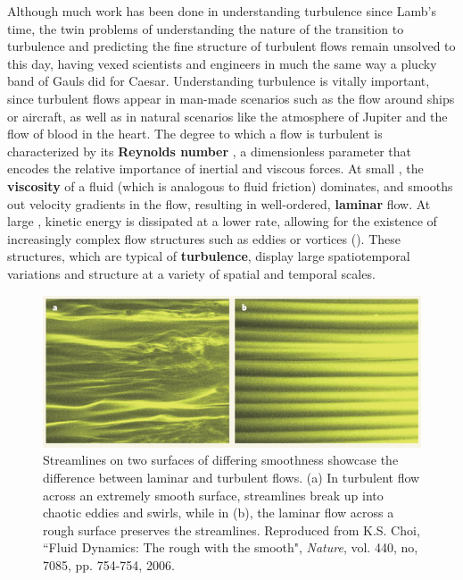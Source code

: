 Although much work has been done in understanding turbulence since Lamb's time, the twin problems of understanding the nature of the transition to turbulence and predicting the fine structure of turbulent flows remain unsolved to this day, having vexed scientists and engineers in much the same way a plucky band of Gauls did for Caesar. Understanding turbulence is vitally important, since turbulent flows appear in man-made scenarios such as the flow around ships or aircraft, as well as in natural scenarios like the atmosphere of Jupiter and the flow of blood in the heart. The degree to which a flow is turbulent is characterized by its {\bf Reynolds number} \ReN, a dimensionless parameter that encodes the relative importance of inertial and viscous forces. At small \ReN, the {\bf viscosity} of a fluid (which is analogous to fluid friction) dominates, and smooths out velocity gradients in the flow, resulting in well-ordered, {\bf laminar} flow. At large \ReN, kinetic energy is dissipated at a lower rate, allowing for the existence of increasingly complex flow structures such as eddies or vortices (). These structures, which are typical of {\bf turbulence}, display large spatiotemporal variations and structure at a variety of spatial and temporal scales.
\begin{figure}[h]
\centerline{
\includegraphics[width=\textwidth]{Figs/laminarTurbulent}}
\caption[Streamlines on two surfaces of differing smoothness showcase the difference between laminar and turbulent flows.]{Streamlines on two surfaces of differing smoothness showcase the difference between laminar and turbulent flows. (a) In turbulent flow across an extremely smooth surface, streamlines break up into chaotic eddies and swirls, while in (b), the laminar flow across a rough surface preserves the streamlines. Reproduced from K.S. Choi, ``Fluid Dynamics: The rough with the smooth", \emph{Nature},  vol. 440, no, 7085, pp. 754-754, 2006.}\label{fig:cylinderWake}
\end{figure}
